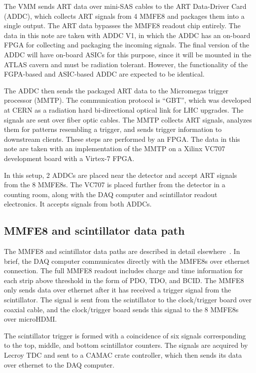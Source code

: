 The VMM sends ART data over mini-SAS cables to the ART Data-Driver Card (ADDC), which collects ART signals from 4 MMFE8 and packages them into a single output. The ART data bypasses the MMFE8 readout chip entirely. The data in this note are taken with ADDC V1, in which the ADDC has an on-board FPGA for collecting and packaging the incoming signals. The final version of the ADDC will have on-board ASICs for this purpose, since it will be mounted in the ATLAS cavern and must be radiation tolerant. However, the functionality of the FGPA-based and ASIC-based ADDC are expected to be identical.

The ADDC then sends the packaged ART data to the Micromegas trigger processor (MMTP). The communication protocol is ``GBT'', which was developed at CERN as a radiation hard bi-directional optical link for LHC upgrades. The signals are sent over fiber optic cables. The MMTP collects ART signals, analyzes them for patterns resembling a trigger, and sends trigger information to downstream clients. These steps are performed by an FPGA. The data in this note are taken with an implementation of the MMTP on a Xilinx VC707 development board with a Virtex-7 FPGA.

In this setup, 2 ADDCs are placed near the detector and accept ART signals from the 8 MMFE8s. The VC707 is placed further from the detector in a counting room, along with the DAQ computer and scintillator readout electronics. It accepts signals from both ADDCs.

\subsection{MMFE8 and scintillator data path}
\label{sec:exp-mmfe}

The MMFE8 and scintillator data paths are described in detail elsewhere~\cite{noisy,noiseless}. In brief, the DAQ computer communicates directly with the MMFE8s over ethernet connection. The full MMFE8 readout includes charge and time information for each strip above threshold in the form of PDO, TDO, and BCID. The MMFE8 only sends data over ethernet after it has received a trigger signal from the scintillator. The signal is sent from the scintillator to the clock/trigger board over coaxial cable, and the clock/trigger board sends this signal to the 8 MMFE8s over microHDMI.

The scintillator trigger is formed with a coincidence of six signals corresponding to the top, middle, and bottom scintillator counters. The signals are acquired by Lecroy TDC and sent to a CAMAC crate controller, which then sends its data over ethernet to the DAQ computer.

